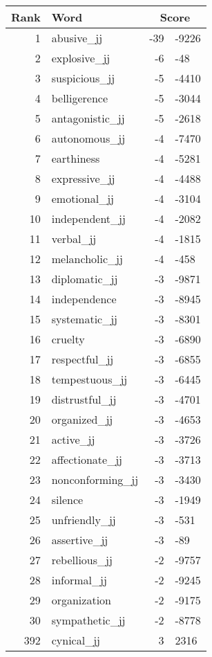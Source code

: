 \begin{longtable}[!htbp]{| rlr@{.}l |}
    \hline
    \textbf{Rank} & \textbf{Word} & \multicolumn{2}{c|}{\textbf{Score}} \\
    \hline
    \endhead
    1 & abusive\_jj & -39 & -9226 \\
    2 & explosive\_jj & -6 & -48 \\
    3 & suspicious\_jj & -5 & -4410 \\
    4 & belligerence & -5 & -3044 \\
    5 & antagonistic\_jj & -5 & -2618 \\
    6 & autonomous\_jj & -4 & -7470 \\
    7 & earthiness & -4 & -5281 \\
    8 & expressive\_jj & -4 & -4488 \\
    9 & emotional\_jj & -4 & -3104 \\
    10 & independent\_jj & -4 & -2082 \\
    11 & verbal\_jj & -4 & -1815 \\
    12 & melancholic\_jj & -4 & -458 \\
    13 & diplomatic\_jj & -3 & -9871 \\
    14 & independence & -3 & -8945 \\
    15 & systematic\_jj & -3 & -8301 \\
    16 & cruelty & -3 & -6890 \\
    17 & respectful\_jj & -3 & -6855 \\
    18 & tempestuous\_jj & -3 & -6445 \\
    19 & distrustful\_jj & -3 & -4701 \\
    20 & organized\_jj & -3 & -4653 \\
    21 & active\_jj & -3 & -3726 \\
    22 & affectionate\_jj & -3 & -3713 \\
    23 & nonconforming\_jj & -3 & -3430 \\
    24 & silence & -3 & -1949 \\
    25 & unfriendly\_jj & -3 & -531 \\
    26 & assertive\_jj & -3 & -89 \\
    27 & rebellious\_jj & -2 & -9757 \\
    28 & informal\_jj & -2 & -9245 \\
    29 & organization & -2 & -9175 \\
    30 & sympathetic\_jj & -2 & -8778 \\
    392 & cynical\_jj & 3 & 2316 \\

\end{longtable}
